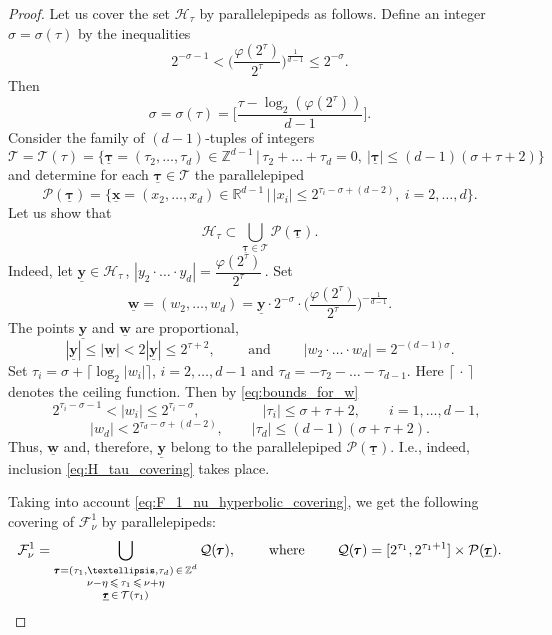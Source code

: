 \documentclass[10pt,a4paper]{amsart}
\newcommand{\R}{\mathbb{R}}
\newcommand{\Z}{\mathbb{Z}}
\newcommand{\cF}{\mathcal{F}}
\newcommand{\cH}{\mathcal{H}}
\newcommand{\cP}{\mathcal{P}}
\newcommand{\cQ}{\mathcal{Q}}
\newcommand{\cT}{\mathcal{T}}
\renewcommand{\leq}{\leqslant}
\renewcommand{\vec}[1]{\mathbf{#1}}
\begin{document}
\begin{proof}
  Let us cover the set $\cH_\tau$ by parallelepipeds as follows. Define an integer $\sigma=\sigma(\tau)$ by the inequalities
  \[
    2^{-\sigma-1}<
    \bigg(\dfrac{\varphi(2^\tau)}{2^\tau}\bigg)^{\frac1{d-1}}\leq
    2^{-\sigma}.
  \]
  Then
  \begin{equation}\label{eq:sigma_of_tau}
    \sigma=\sigma(\tau)=\bigg[\frac{\tau-\log_2(\varphi(2^\tau))}{d-1}\bigg].
  \end{equation}
  Consider the family of $(d-1)$-tuples of integers
  \[
    \cT=\cT(\tau)=\Big\{\underline{\pmb\tau}=(\tau_2,\ldots,\tau_d)\in\Z^{d-1} \,\Big|\, \tau_2+\ldots+\tau_d=0,\ |\underline{\pmb\tau}|\leq(d-1)(\sigma+\tau+2) \Big\}
  \]  
  and determine for each $\underline{\pmb\tau}\in\cT$ the parallelepiped
  \[
    \cP(\underline{\pmb\tau})=
    \Big\{\underline{\vec x}=(x_2,\ldots,x_d)\in\R^{d-1} \,\Big|\, |x_i|\leq2^{\tau_i-\sigma+(d-2)},\ i=2,\ldots,d \Big\}.
  \]
  Let us show that
  \begin{equation}\label{eq:H_tau_covering}
    \cH_\tau\subset\bigcup_{\underline{\pmb\tau}\in\cT}\cP(\underline{\pmb\tau}).
  \end{equation}
  Indeed, let $\underline{\vec y}\in\cH_\tau$\,, $|y_2\cdot\ldots\cdot y_d|=\dfrac{\varphi(2^\tau)}{2^\tau}$\,. Set
  \[
    \underline{\vec w}=(w_2,\ldots,w_d)=
    \underline{\vec y}\cdot2^{-\sigma}\cdot\bigg(\dfrac{\varphi(2^\tau)}{2^\tau}\bigg)^{-\frac1{d-1}}.
  \]
  The points $\underline{\vec y}$ and $\underline{\vec w}$ are proportional,
  \begin{equation}\label{eq:bounds_for_w}
    |\underline{\vec y}|\leq|\underline{\vec w}|<2|\underline{\vec y}|\leq2^{\tau+2},
    \qquad\text{ and }\qquad
    |w_2\cdot\ldots\cdot w_d|=2^{-(d-1)\sigma}.
  \end{equation}
  Set $\tau_i=\sigma+\big\lceil\log_2|w_i|\big\rceil$, $i=2,\ldots,d-1$ and $\tau_d=-\tau_2-\ldots-\tau_{d-1}$. Here $\lceil\,\cdot\,\rceil$ denotes the ceiling function. Then by \eqref{eq:bounds_for_w}
  \[
    \quad
    2^{\tau_i-\sigma-1}<|w_i|\leq2^{\tau_i-\sigma},
    \qquad\qquad\ \
    |\tau_i|\leq\sigma+\tau+2,
    \qquad
    i=1,\ldots,d-1,
  \]
  \[
    |w_d|<
    2^{\tau_d-\sigma+(d-2)},
    \qquad
    |\tau_d|\leq(d-1)(\sigma+\tau+2).
  \]
  Thus, $\underline{\vec w}$ and, therefore, $\underline{\vec y}$ belong to the parallelepiped $\cP(\underline{\pmb\tau})$. I.e., indeed, inclusion \eqref{eq:H_tau_covering} takes place.
  
  Taking into account \eqref{eq:F_1_nu_hyperbolic_covering}, we get the following covering of $\cF^1_\nu$ by parallelepipeds:
  \[
    \cF^1_\nu=
    \bigcup_{\substack{\pmb\tau=(\tau_1,\ldots,\tau_d)\,\in\,\Z^d \\ 
             \nu-\eta\,\leq\,\tau_1\,\leq\,\nu+\eta \vphantom{\frac11} \\ 
             \underline{\pmb\tau}\,\in\,\cT(\tau_1)}}
    \cQ(\pmb\tau),
    \qquad\text{ where }\qquad
    \cQ(\pmb\tau)=
    [2^{\tau_1},2^{\tau_1+1}]\times\cP(\underline{\pmb\tau}).
  \]
  

\end{proof}
\end{document}
